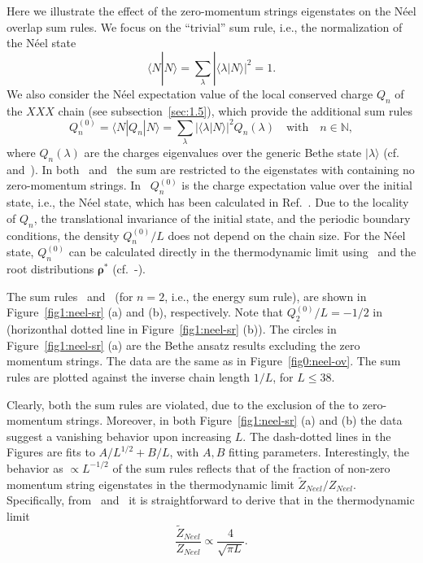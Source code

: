 \documentclass[11pt]{iopart}
\begin{document}
Here we illustrate the effect of the zero-momentum strings eigenstates on the 
N\'eel overlap sum rules. We focus on the ``trivial'' sum rule, i.e., the 
normalization of the N\'eel state  
%
\begin{equation}
\label{sr-trivial}
\langle N|N\rangle=\sum\limits_{\lambda}|\langle\lambda|N\rangle|^2=1. 
\end{equation}
%
We also consider the N\'eel expectation value of the local conserved charge 
$Q_n$ of the $XXX$ chain (see subsection~\ref{sec:1.5}), which provide 
the additional sum rules
%
\begin{equation}
\label{sr-charge}
Q_n^{(0)}=\langle N|Q_n|N\rangle=\sum\limits_{\lambda}|\langle\lambda|N\rangle|^2
Q_{n}(\lambda)\quad\textrm{with}\quad n\in\mathbb{N}, 
\end{equation}
%
where $Q_n(\lambda)$ are the charges eigenvalues over the generic Bethe state 
$|\lambda\rangle$ (cf.~ and~). 
In both~ and~ the sum are restricted to the 
eigenstates with containing no zero-momentum strings. 
In~ $Q_n^{(0)}$ is the charge expectation value over the initial 
state, i.e., the N\'eel state, which has been calculated in Ref.~\cite{fagotti-2013}. 
Due to the locality of $Q_n$, the translational invariance of the initial 
state, and the periodic boundary conditions, the density $Q_n^{(0)}/L$ does 
not depend on the chain size. For the N\'eel state, $Q_n^{(0)}$ can be calculated 
directly in the thermodynamic limit using~ and the root distributions 
$\pmb{\rho}^*$ (cf.~-). 

The sum rules~ and~ (for $n=2$, i.e., the energy 
sum rule), are shown in Figure~\ref{fig1:neel-sr} (a) and (b), respectively. 
Note that $Q^{(0)}_2/L=-1/2$ in~ (horizonthal dotted line in 
Figure~\ref{fig1:neel-sr} (b)). 
The circles in Figure~\ref{fig1:neel-sr} (a) are the Bethe ansatz results excluding 
the zero momentum strings. The data are the same as in Figure~\ref{fig0:neel-ov}. 
The sum rules are plotted against the inverse chain length $1/L$, for $L\le 38$. 

Clearly, both the sum rules are violated, due to the exclusion of the to zero-momentum 
strings. Moreover, in both Figure~\ref{fig1:neel-sr} (a) and (b) the data suggest a 
vanishing behavior upon increasing $L$. The dash-dotted lines in the Figures are fits to  
$A/L^{1/2}+B/L$, with $A,B$ fitting parameters. Interestingly, the behavior as $\propto 
L^{-1/2}$ of the sum rules reflects that of the fraction of non-zero momentum string 
eigenstates in the thermodynamic limit $\widetilde Z_{Neel}/Z_{Neel}$. Specifically, 
from~ and~ it is straightforward to derive that in the 
thermodynamic limit 
%
\begin{equation}
\label{beh}
\frac{\widetilde Z_{Neel}}{Z_{Neel}}\propto\frac{4}{\sqrt{\pi L}}. 
\end{equation}
% 
\end{document}
